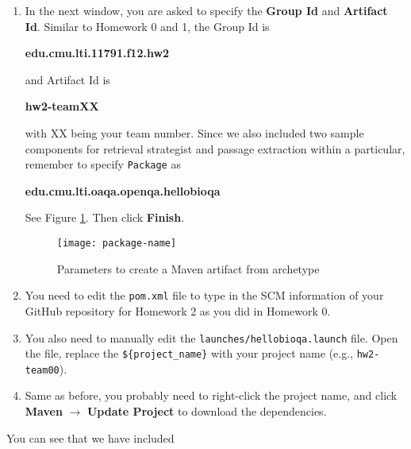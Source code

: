 \begin{enumerate}
\item In the next window, you are asked to specify the \textbf{Group Id} and
\textbf{Artifact Id}. Similar to Homework 0 and 1, the Group Id is

\begin{center}
\textbf{edu.cmu.lti.11791.f12.hw2}
\end{center}

and Artifact Id is

\begin{center}
\textbf{hw2-teamXX}
\end{center}

with XX being your team number. Since we also included two sample components for
retrieval strategist and passage extraction within a particular, remember to
specify \texttt{Package} as

\begin{center}
\textbf{edu.cmu.lti.oaqa.openqa.hellobioqa}
\end{center}

See Figure \ref{fig:package-name}. Then click \textbf{Finish}.

\begin{figure}[t]
\centering
\texttt{[image: package-name]}
\caption{Parameters to create a Maven artifact from archetype\label{fig:package-name}}
\end{figure}

\item You need to edit the \texttt{pom.xml} file to type in the SCM information
of your GitHub repository for Homework 2 as you did in Homework 0.

\item You also need to manually edit the \texttt{launches/hellobioqa.launch}
file. Open the file, replace the \verb|${project_name}| with your project name
(e.g., \verb|hw2-team00|).

\item Same as before, you probably need to right-click the project name, and
click \textbf{Maven} $\rightarrow$ \textbf{Update Project} to download the
dependencies.

\end{enumerate}

You can see that we have included

